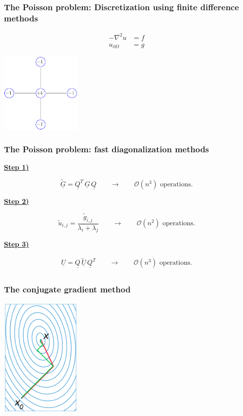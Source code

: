 \documentclass{beamer}
\begin{document}
\begin{frame}\frametitle{The Poisson problem: Discretization using finite difference methods}
\[
  \begin{split}
    -\nabla^2 u &= f \\
    u_{\partial\Omega} &= g
  \end{split}
\]
\begin{center}
\includegraphics[width=4cm]{FivePointStencil}
\end{center}
\end{frame}
\begin{frame}\frametitle{The Poisson problem: fast diagonalization methods}
\underline{\textbf{Step 1)}}

\begin{equation}
  \underline{{\widetilde{G}}} = \underline{Q}^T \,\underline{G}\, \underline{Q} \qquad \longrightarrow \qquad \mathcal{O}(n^3) \text{ operations}.
\end{equation}

\underline{\textbf{Step 2)}}

\begin{equation}
  \widetilde{u}_{i,j} = \frac{\widetilde{g}_{i,j}}{\lambda_i + \lambda_j} \qquad \longrightarrow \qquad \mathcal{O}(n^2) \text{ operations}.
\end{equation}

\underline{\textbf{Step 3)}}

\begin{align}
  \underline{U} = \underline{Q} \,\underline{\widetilde{U}} \,\underline{Q}^T \qquad \longrightarrow \qquad \mathcal{O}(n^3) \text{ operations}. \\ \nonumber
\end{align}
\end{frame}

\begin{frame}\frametitle{The conjugate gradient method}
  \begin{center}
    \includegraphics[width=4cm]{cg}
  \end{center}
\end{frame}
\end{document}
